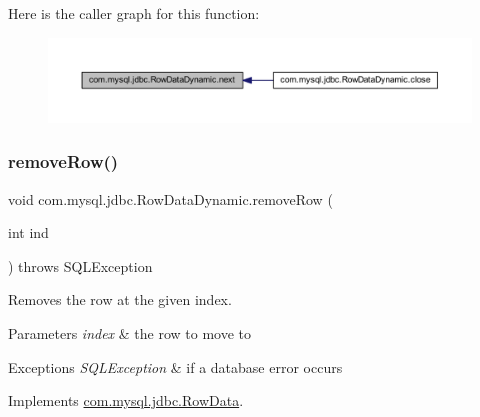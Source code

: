 Here is the caller graph for this function\+:
\nopagebreak
\begin{figure}[H]
\begin{center}
\leavevmode
\includegraphics[width=350pt]{classcom_1_1mysql_1_1jdbc_1_1_row_data_dynamic_af940fe3daed4a966db30feb64581dfe6_icgraph}
\end{center}
\end{figure}
\mbox{\label{classcom_1_1mysql_1_1jdbc_1_1_row_data_dynamic_a96a481601d6ef8046687071a42abe97b}} 
\subsubsection{\texorpdfstring{remove\+Row()}{removeRow()}}
{\footnotesize\ttfamily void com.\+mysql.\+jdbc.\+Row\+Data\+Dynamic.\+remove\+Row (\begin{DoxyParamCaption}\item[{int}]{ind }\end{DoxyParamCaption}) throws S\+Q\+L\+Exception}

Removes the row at the given index.


\begin{DoxyParams}{Parameters}
{\em index} & the row to move to \\
\hline
\end{DoxyParams}

\begin{DoxyExceptions}{Exceptions}
{\em S\+Q\+L\+Exception} & if a database error occurs \\
\hline
\end{DoxyExceptions}


Implements \mbox{\hyperlink{interfacecom_1_1mysql_1_1jdbc_1_1_row_data_ac60b2e20cd7043fb730f0977386e80be}{com.\+mysql.\+jdbc.\+Row\+Data}}.

\mbox{\label{classcom_1_1mysql_1_1jdbc_1_1_row_data_dynamic_aab0a24e677281551b2f7e03e3ffd9c87}} 
